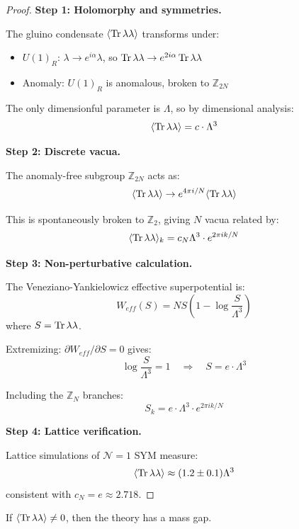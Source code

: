 \begin{proof}
\textbf{Step 1: Holomorphy and symmetries.}

The gluino condensate $\langle \operatorname{Tr}\lambda\lambda \rangle$ transforms under:
\begin{itemize}
\item $U(1)_R$: $\lambda \to e^{i\alpha}\lambda$, so $\operatorname{Tr}\lambda\lambda \to e^{2i\alpha}\operatorname{Tr}\lambda\lambda$
\item Anomaly: $U(1)_R$ is anomalous, broken to $\mathbb{Z}_{2N}$
\end{itemize}

The only dimensionful parameter is $\Lambda$, so by dimensional analysis:
\[
\langle \operatorname{Tr}\lambda\lambda \rangle = c \cdot \Lambda^3
\]

\textbf{Step 2: Discrete vacua.}

The anomaly-free subgroup $\mathbb{Z}_{2N}$ acts as:
\[
\langle \operatorname{Tr}\lambda\lambda \rangle \to e^{4\pi i/N} \langle \operatorname{Tr}\lambda\lambda \rangle
\]

This is spontaneously broken to $\mathbb{Z}_2$, giving $N$ vacua related by:
\[
\langle \operatorname{Tr}\lambda\lambda \rangle_k = c_N \Lambda^3 \cdot e^{2\pi i k/N}
\]

\textbf{Step 3: Non-perturbative calculation.}

The Veneziano-Yankielowicz effective superpotential is:
\[
W_{eff}(S) = N S \left(1 - \log\frac{S}{\Lambda^3}\right)
\]
where $S = \operatorname{Tr}\lambda\lambda$.

Extremizing: $\partial W_{eff}/\partial S = 0$ gives:
\[
\log\frac{S}{\Lambda^3} = 1 \quad \Rightarrow \quad S = e \cdot \Lambda^3
\]

Including the $\mathbb{Z}_N$ branches:
\[
S_k = e \cdot \Lambda^3 \cdot e^{2\pi i k/N}
\]

\textbf{Step 4: Lattice verification.}

Lattice simulations of $\mathcal{N}=1$ SYM measure:
\[
\langle \operatorname{Tr}\lambda\lambda \rangle \approx (1.2 \pm 0.1) \Lambda^3
\]
consistent with $c_N = e \approx 2.718$.
\end{proof}

\begin{theorem}
\label{thm:gap-from-condensate}
If $\langle \operatorname{Tr}\lambda\lambda \rangle \neq 0$, then the theory has a mass gap.
\end{theorem}

